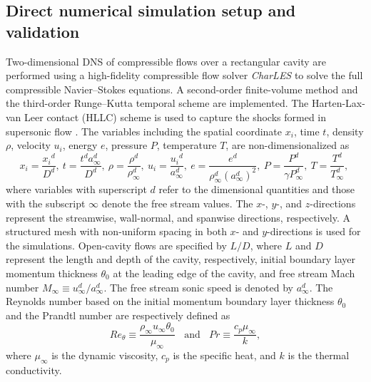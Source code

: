 \documentclass{jfm}
\begin{document}
\subsection{Direct numerical simulation setup and validation}
Two-dimensional DNS of compressible flows over a rectangular cavity are performed using a high-fidelity compressible flow solver {\it{CharLES}} \citep{Khalighi:ASME2011, Khalighi:AIAA11, Bres:AIAAJ17} to solve the full compressible Navier--Stokes equations. A second-order finite-volume method and the third-order Runge--Kutta temporal scheme are implemented. 
The Harten-Lax-van Leer contact (HLLC) scheme is used to capture the shocks formed in supersonic flow  \citep{Toro:09}. The variables including the spatial coordinate $x_i$, time $t$, density $\rho$, velocity $u_i$, energy $e$, pressure $P$, temperature $T$, are non-dimensionalized as
\[
x_i = \frac{{x_i} ^d}{D^d},~
t = \frac{t^d a_\infty^d}{D^d},~
\rho = \frac{\rho ^d}{\rho_{\infty}^d},~
u_i = \frac{{u_i} ^d}{a_{\infty}^d},~
e = \frac{e ^d}{\rho_{\infty}^d (a_{\infty}^d)^2},~
P =  \frac{P ^d}{\gamma P_\infty^d},~
T = \frac{T ^d}{T_\infty^d},~
\]
where variables with superscript $d$ refer to the dimensional quantities and those with the subscript $\infty$ denote the free stream values. The $x$-, $y$-, and $z$-directions represent the streamwise, wall-normal, and spanwise directions, respectively. A structured mesh with non-uniform spacing in both $x$- and $y$-directions is used for the simulations. Open-cavity flows are specified by $L/D$, where $L$ and $D$ represent the length and depth of the cavity, respectively, initial boundary layer momentum thickness $\theta_0$ at the leading edge of the cavity, and free stream Mach number $M_\infty \equiv u^d_\infty/a^d_\infty$. The free stream sonic speed is denoted by $a_\infty^d$. The Reynolds number based on the initial momentum boundary layer thickness $\theta_0$ and the Prandtl number are respectively defined as
\[
Re_\theta\equiv \frac{\rho_\infty u_\infty \theta_0}{\mu_\infty}~~~~\text{and}~~~~Pr \equiv \frac{c_p \mu_\infty}{k},
\]
where $\mu_\infty$ is the dynamic viscosity, $c_p$ is the specific heat, and $k$ is the thermal conductivity.
 
\end{document}
